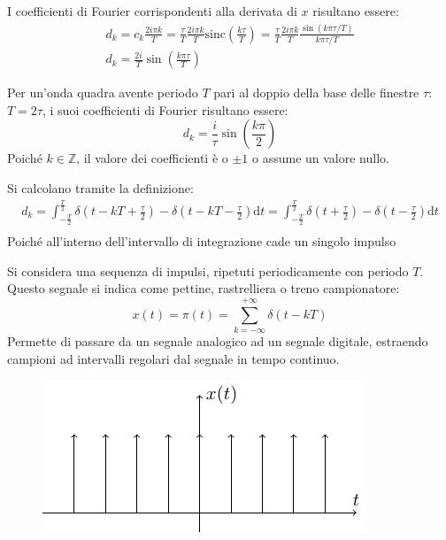 \documentclass{article}
\newcommand{\sinc}{\mathrm{sinc}}
\newcommand{\df}{\mathrm{d}}
\numberwithin{equation}{subsection}
\begin{document}
I coefficienti di Fourier corrispondenti alla derivata di $x$ risultano essere:
\begin{gather*}
    d_k=c_k\displaystyle\frac{2i\pi k}{T}=\frac{\tau}{T}\frac{2i\pi k}{T}\sinc\left({\frac{k\tau}{T}}\right)=\frac{\tau}{T}\frac{2i\pi k}{T}\frac{\sin(k\pi \tau/T)}{k\pi \tau/T}\\
    d_k=\displaystyle\frac{2i}{T}\sin\left(\frac{k\pi\tau}{T}\right)
\end{gather*}

Per un'onda quadra avente periodo $T$ pari al doppio della base delle finestre $\tau$: $T=2\tau$, i suoi coefficienti di Fourier risultano essere:
\begin{equation*}
    d_k=\displaystyle\frac{i}{\tau}\sin\left(\frac{k\pi}{2}\right)
\end{equation*}
Poiché $k\in\mathbb{Z}$, il valore dei coefficienti è o $\pm1$ o assume un valore nullo. 

Si calcolano tramite la definizione:
\begin{gather*}
    d_k=\displaystyle\int_{-\frac{T}{2}}^{\frac{T}{2}}\delta\left(t-kT+\frac{\tau}{2}\right)-\delta\left(t-kT-\frac{\tau}{2}\right)\df t=
    \int_{-\frac{T}{2}}^{\frac{T}{2}}\delta\left(t+\frac{\tau}{2}\right)-\delta\left(t-\frac{\tau}{2}\right)\df t\\
\end{gather*}
Poiché all'interno dell'intervallo di integrazione cade un singolo impulso



Si considera una sequenza di impulsi, ripetuti periodicamente con periodo $T$. Questo segnale si indica 
come pettine, rastrelliera o treno campionatore:
\begin{equation*}
    x(t)=\pi(t)=\displaystyle\sum_{k=-\infty}^{+\infty}\delta(t-kT)
\end{equation*}
Permette di passare da un segnale analogico ad un segnale digitale, estraendo campioni ad intervalli regolari dal segnale in tempo continuo. 

\begin{figure}[H]%
    \centering
    \includegraphics{rastrelliera.pdf}%
\end{figure}
\end{document}
